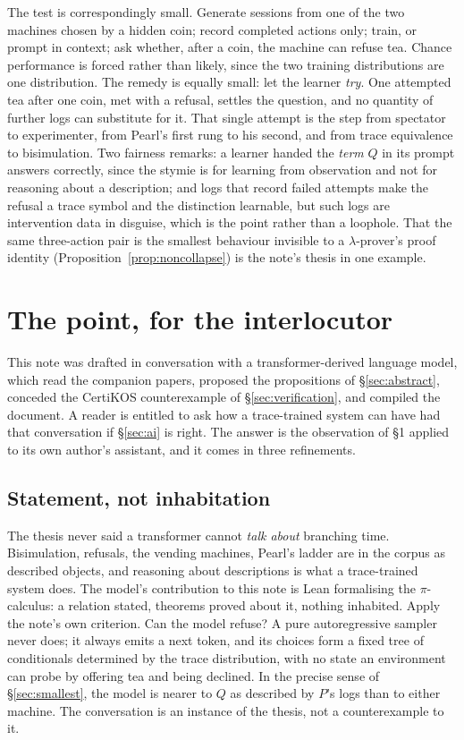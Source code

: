 \documentclass[11pt]{article}
\theoremstyle{plain}
\theoremstyle{definition}
\theoremstyle{remark}
\begin{document}
The test is correspondingly small. Generate sessions from one of the two
machines chosen by a hidden coin; record completed actions only; train, or
prompt in context; ask whether, after a coin, the machine can refuse tea.
Chance performance is forced rather than likely, since the two training
distributions are one distribution. The remedy is equally small: let the
learner \emph{try}. One attempted tea after one coin, met with a refusal,
settles the question, and no quantity of further logs can substitute for
it. That single attempt is the step from spectator to experimenter, from
Pearl's first rung to his second, and from trace equivalence to
bisimulation. Two fairness remarks: a learner handed the \emph{term} $Q$ in
its prompt answers correctly, since the stymie is for learning from
observation and not for reasoning about a description; and logs that record
failed attempts make the refusal a trace symbol and the distinction
learnable, but such logs are intervention data in disguise, which is the
point rather than a loophole. That the same three-action pair is the smallest
behaviour invisible to a $\lambda$-prover's proof identity
(Proposition~\ref{prop:noncollapse}) is the note's thesis in one example.

\section{The point, for the interlocutor}\label{sec:interlocutor}

This note was drafted in conversation with a transformer-derived language
model, which read the companion papers, proposed the propositions of
\S\ref{sec:abstract}, conceded the CertiKOS counterexample of
\S\ref{sec:verification}, and compiled the document. A reader is entitled
to ask how a trace-trained system can have had that conversation if
\S\ref{sec:ai} is right. The answer is the observation of \S1 applied to its
own author's assistant, and it comes in three refinements.

\subsection{Statement, not inhabitation}

The thesis never said a transformer cannot \emph{talk about} branching time.
Bisimulation, refusals, the vending machines, Pearl's ladder are in the corpus
as described objects, and reasoning about descriptions is what a trace-trained
system does. The model's contribution to this note is Lean formalising the
$\pi$-calculus: a relation stated, theorems proved about it, nothing
inhabited. Apply the note's own criterion. Can the model refuse? A pure
autoregressive sampler never does; it always emits a next token, and its
choices form a fixed tree of conditionals determined by the trace
distribution, with no state an environment can probe by offering tea and
being declined. In the precise sense of \S\ref{sec:smallest}, the model is
nearer to $Q$ as described by $P$'s logs than to either machine. The
conversation is an instance of the thesis, not a counterexample to it.
\end{document}
